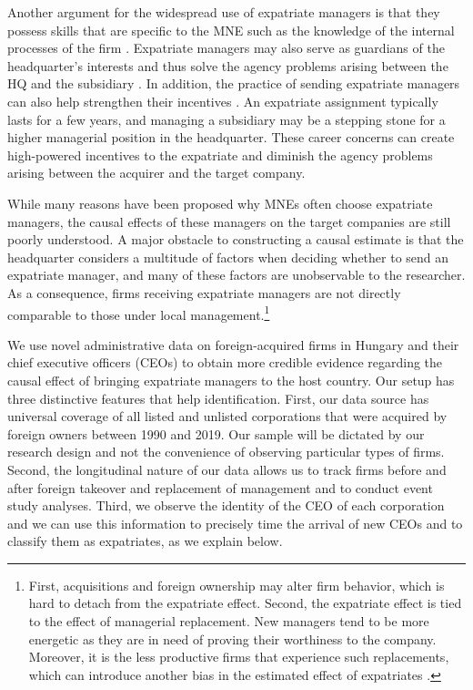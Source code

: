 \documentclass[12pt,a4paper]{article}
\begin{document}
Another argument for the widespread use of expatriate managers is that they possess skills that are specific to the MNE such as the knowledge of the internal processes of the firm \citep{collings2019global, harzing2001bears}. Expatriate managers may also serve as guardians of the headquarter's interests and thus solve the agency problems arising between the HQ and the subsidiary \citep{kostova2018understanding, o2000managing}. In addition, the practice of sending expatriate managers can also help strengthen their incentives \citep{grossman1986costs}. An expatriate assignment typically lasts for a few years, and managing a subsidiary may be a stepping stone for a higher managerial position in the headquarter. These career concerns can create high-powered incentives to the expatriate and diminish the agency problems arising between the acquirer and the target company.

While many reasons have been proposed why MNEs often choose expatriate managers, the causal effects of these managers on the target companies are still poorly understood. A major obstacle to constructing a causal estimate is that the headquarter considers a multitude of factors when deciding whether to send an expatriate manager, and many of these factors are unobservable to the researcher. As a consequence, firms receiving expatriate managers are not directly comparable to those under local management.\footnote{First, acquisitions \citep{bertrand2003enjoying} and foreign ownership \citep{Brown2006-rn} may alter firm behavior, which is hard to detach from the expatriate effect. Second, the expatriate effect is tied to the effect of managerial replacement. New managers tend to be more energetic as they are in need of proving their worthiness to the company. Moreover, it is the less productive firms that experience such replacements, which can introduce another bias in the estimated effect of expatriates \citep{denis1995performance}.}

We use novel administrative data on foreign-acquired firms in Hungary and their chief executive officers (CEOs) to obtain more credible evidence regarding the causal effect of bringing expatriate managers to the host country. Our setup has three distinctive features that help identification. First, our data source has universal coverage of all listed and unlisted corporations that were acquired by foreign owners between 1990 and 2019. Our sample will be dictated by our research design and not the convenience of observing particular types of firms. Second, the longitudinal nature of our data allows us to track firms before and after foreign takeover and replacement of management and to conduct event study analyses. Third, we observe the identity of the CEO of each corporation and we can use this information to precisely time the arrival of new CEOs and to classify them as expatriates, as we explain below.
\end{document}
